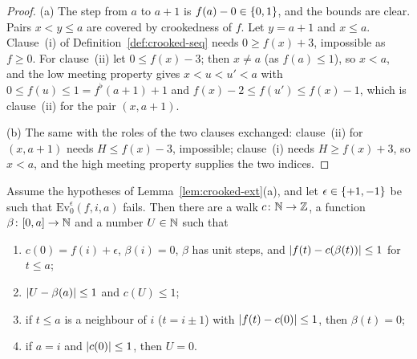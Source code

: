 \begin{proof}
(a) The step from $a$ to $a+1$ is $f(a)-0\in\left\{ 0,1 \right\}$, and the bounds are clear. Pairs $x<y\le a$ are covered by crookedness of
$f$. Let $y=a+1$ and $x\le a$. Clause~(i) of Definition~\ref{def:crooked-seq} needs $0\ge f(x)+3$, impossible as $f\ge0$. For
clause~(ii) let $0\le f(x)-3$; then $x\ne a$ (as $f(a)\le1$), so $x<a$, and the low meeting property gives $x<u<u'<a$ with $0\le
f(u)\le1=f^\flat(a+1)+1$ and $f(x)-2\le f(u')\le f(x)-1$, which is clause~(ii) for the pair $(x,a+1)$.

(b) The same with the roles of the two clauses exchanged: clause~(ii) for $(x,a+1)$ needs $H\le f(x)-3$, impossible; clause~(i)
needs $H\ge f(x)+3$, so $x<a$, and the high meeting property supplies the two indices.
\end{proof}


\begin{lemma}\label{lem:fake-low}
Assume the hypotheses of Lemma~\ref{lem:crooked-ext}(a), and let $\epsilon\in\left\{ +1,-1 \right\}$ be such that $\mathrm{Ev}^\epsilon_0(f,i,a)$
fails. Then there are a walk $c\colon\mathbb{N}\to\mathbb{Z}$, a function $\beta\colon[0,a]\to\mathbb{N}$ and a number $U\in\mathbb{N}$ such that
\begin{enumerate}[label=(\alph*)]
\item $c(0)=f(i)+\epsilon$, $\beta(i)=0$, $\beta$ has unit steps, and $\left\lvert f(t)-c(\beta(t))\right\rvert\le1$ for $t\le a$;
\item $\left\lvert U-\beta(a)\right\rvert\le1$ and $c(U)\le1$;
\item if $t\le a$ is a neighbour of $i$ ($t=i\pm1$) with $\left\lvert f(t)-c(0)\right\rvert\le1$, then $\beta(t)=0$;
\item if $a=i$ and $\left\lvert c(0)\right\rvert\le1$, then $U=0$.
\end{enumerate}
\end{lemma}

